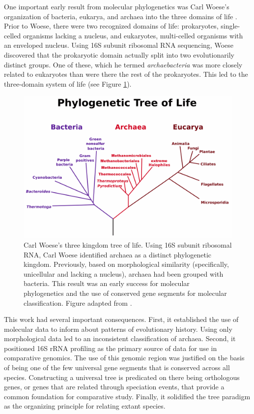 One important early result from molecular phylogenetics was Carl Woese's organization of bacteria, eukarya, and archaea into the three domains of life \cite{Woese:1977vd}.
Prior to Woese, there were two recognized domains of life: prokaryotes, single-celled organisms lacking a nucleus, and eukaryotes, multi-celled organisms with an enveloped nucleus.
Using 16S subunit ribosomal RNA sequencing, Woese discovered that the prokaryotic domain actually split into two evolutionarily distinct groups.
One of these, which he termed \emph{archaebacteria} was more closely related to eukaryotes than were there the rest of the prokaryotes.
This led to the three-domain system of life (see Figure \ref{fig:woese_tree}).

\begin{figure}
\centering
\includegraphics[width=.7\columnwidth]{./fig/introduction/woese_tree.png}
\caption[Carl Woese's Three Kingdom Tree of Life]{Carl Woese's three kingdom tree of life. Using 16S subunit ribosomal RNA, Carl Woese identified archaea as a distinct phylogenetic kingdom. Previously, based on morphological similarity (specifically, unicellular and lacking a nucleus), archaea had been grouped with bacteria. This result was an early success for molecular phylogenetics and the use of conserved gene segments for molecular classification. Figure adapted from \cite{Woese:1990uc}.}
\label{fig:woese_tree}
\end{figure}

This work had several important consequences.
First, it established the use of molecular data to inform about patterns of evolutionary history.
Using only morphological data led to an inconsistent classification of archaea.
Second, it positioned 16S rRNA profiling as the primary source of data for use in comparative genomics.
The use of this genomic region was justified on the basis of being one of the few universal gene segments that is conserved across all species.
Constructing a universal tree is predicated on there being orthologous genes, or genes that are related through speciation events, that provide a common foundation for comparative study.
Finally, it solidified the tree paradigm as the organizing principle for relating extant species.

